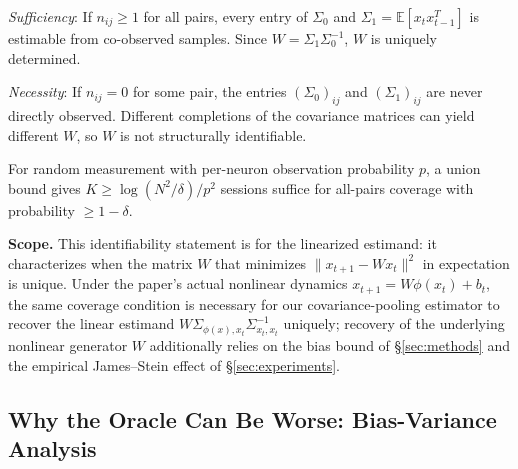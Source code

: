\documentclass{article}
\begin{document}
\emph{Sufficiency}: If $n_{ij} \geq 1$ for all pairs, every entry of $\Sigma_0$ and $\Sigma_1 = \mathbb{E}[x_t x_{t-1}^T]$ is estimable from co-observed samples. Since $W = \Sigma_1 \Sigma_0^{-1}$, $W$ is uniquely determined.

\emph{Necessity}: If $n_{ij} = 0$ for some pair, the entries $(\Sigma_0)_{ij}$ and $(\Sigma_1)_{ij}$ are never directly observed. Different completions of the covariance matrices can yield different $W$, so $W$ is not structurally identifiable.

For random measurement with per-neuron observation probability $p$, a union bound gives $K \geq \log(N^2/\delta) / p^2$ sessions suffice for all-pairs coverage with probability $\geq 1-\delta$.

\textbf{Scope.} This identifiability statement is for the linearized estimand: it characterizes when the matrix $W$ that minimizes $\|x_{t+1} - W x_t\|^2$ in expectation is unique. Under the paper's actual nonlinear dynamics $x_{t+1} = W\phi(x_t) + b_t$, the same coverage condition is necessary for our covariance-pooling estimator to recover the linear estimand $W \Sigma_{\phi(x),x_t} \Sigma_{x_t,x_t}^{-1}$ uniquely; recovery of the underlying nonlinear generator $W$ additionally relies on the bias bound of \S\ref{sec:methods} and the empirical James--Stein effect of \S\ref{sec:experiments}.

\subsection{Why the Oracle Can Be Worse: Bias-Variance Analysis}
\label{sec:app_oracle}
\end{document}
